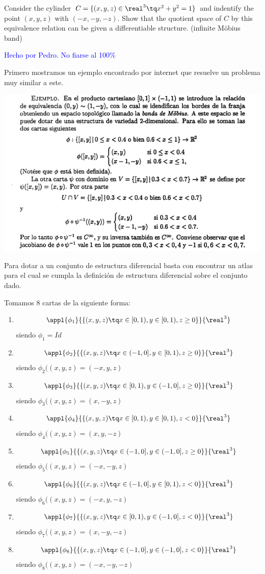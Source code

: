 \begin{problem}[6]
Consider the cylinder $C=\{(x,y,z) \in \real^3 \tq x^2+y^2=1\}$ and indentify the point $(x,y,z)$ with $(-x,-y,-z)$. Show that the quotient space of $C$ by this equivalence relation can be given a differentiable structure. (infinite Möbius band)
\solution

\textcolor{blue}{Hecho por Pedro. No fiarse al 100\%}

Primero mostramos un ejemplo encontrado por internet que resuelve un problema muy similar a este.

\begin{center}
\includegraphics[keepaspectratio=true,width=\linewidth]{img/ejemplo_6.png}
\end{center}

Para dotar a un conjunto de estructura diferencial basta con encontrar un atlas para el cual se cumpla la definición de estructura diferencial sobre el conjunto dado.

Tomamos 8 cartas de la siguiente forma:
\begin{enumerate}
\item
\[\appl{\phi_1}{\{(x,y,z) \tq x\in [0,1), y \in [0,1), z \geq 0\}}{\real^3}\]
siendo $\phi_1=Id$
\item
\[\appl{\phi_2}{\{(x,y,z) \tq x\in (-1,0], y \in [0,1), z \geq 0\}}{\real^3}\]
siendo $\phi_2((x,y,z)=(-x,y,z)$
\item
\[\appl{\phi_3}{\{(x,y,z) \tq x\in [0,1), y \in (-1,0], z \geq 0\}}{\real^3}\]
siendo $\phi_3((x,y,z)=(x,-y,z)$
\item
\[\appl{\phi_4}{\{(x,y,z) \tq x\in [0,1), y \in [0,1), z < 0\}}{\real^3}\]
siendo $\phi_4((x,y,z)=(x,y,-z)$
\item
\[\appl{\phi_5}{\{(x,y,z) \tq x\in (-1,0], y \in (-1,0], z \geq 0\}}{\real^3}\]
siendo $\phi_5((x,y,z)=(-x,-y,z)$
\item
\[\appl{\phi_6}{\{(x,y,z) \tq x\in (-1,0], y \in [0,1), z < 0\}}{\real^3}\]
siendo $\phi_6((x,y,z)=(-x,y,-z)$
\item
\[\appl{\phi_7}{\{(x,y,z) \tq x\in [0,1), y \in (-1,0], z < 0\}}{\real^3}\]
siendo $\phi_7((x,y,z)=(x,-y,-z)$
\item
\[\appl{\phi_8}{\{(x,y,z) \tq x\in (-1,0], y \in (-1,0], z < 0\}}{\real^3}\]
siendo $\phi_8((x,y,z)=(-x,-y,-z)$


\end{enumerate}
\end{problem}
